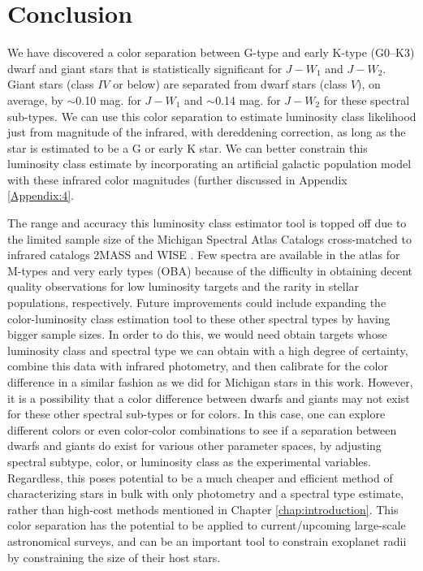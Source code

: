 \chapter{Conclusion}\label{chap:conclusion}

We have discovered a color separation between G-type and early K-type (G0--K3) dwarf and giant stars that is statistically significant for $J-W_{1}$ and $J-W_{2}$. Giant stars (class $IV$ or below) are separated from dwarf stars (class $V$), on average, by $\sim$0.10 mag. for $J-W_{1}$ and $\sim$0.14 mag. for $J-W_{2}$ for these spectral sub-types. We can use this color separation to estimate luminosity class likelihood just from magnitude of the infrared, with dereddening correction, as long as the star is estimated to be a G or early K star. We can better constrain this luminosity class estimate by incorporating an artificial galactic population model with these infrared color magnitudes (further discussed in Appendix \ref{Appendix:4}.

The range and accuracy this luminosity class estimator tool is topped off due to the limited sample size of the Michigan Spectral Atlas Catalogs \citep{Houk1975,Houk1978,Houk1982,Houk1988,Houk1999} cross-matched to infrared catalogs 2MASS \citep{2MASS} and WISE \citep{WISE}. Few spectra are available in the atlas for M-types and very early types (OBA) because of the difficulty in obtaining decent quality observations for low luminosity targets and the rarity in stellar populations, respectively. Future improvements could include expanding the color-luminosity class estimation tool to these other spectral types by having bigger sample sizes. In order to do this, we would need obtain targets whose luminosity class and spectral type we can obtain with a high degree of certainty, combine this data with infrared photometry, and then calibrate for the color difference in a similar fashion as we did for Michigan stars in this work. However, it is a possibility that a color difference between dwarfs and giants may not exist for these other spectral sub-types or for colors. In this case, one can explore different colors or even color-color combinations to see if a separation between dwarfs and giants do exist for various other parameter spaces, by adjusting spectral subtype, color, or luminosity class as the experimental variables. Regardless, this poses potential to be a much cheaper and efficient method of characterizing stars in bulk with only photometry and a spectral type estimate, rather than high-cost methods mentioned in Chapter \ref{chap:introduction}. This color separation has the potential to be applied to current/upcoming large-scale astronomical surveys, and can be an important tool to constrain exoplanet radii by constraining the size of their host stars.

